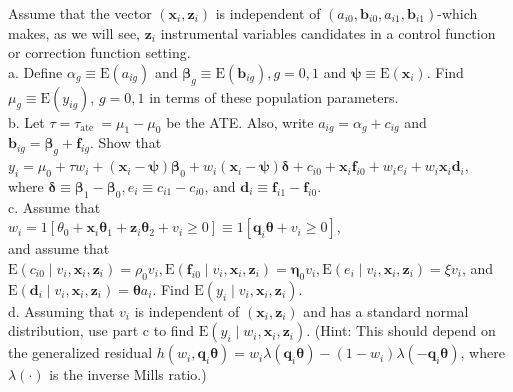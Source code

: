 \documentclass[10pt]{article}
\begin{document}
Assume that the vector $\left(\mathbf{x}_{i}, \mathbf{z}_{i}\right)$ is independent of $\left(a_{i 0}, \mathbf{b}_{i 0}, a_{i 1}, \mathbf{b}_{i 1}\right)$-which makes, as we will see, $\mathbf{z}_{i}$ instrumental variables candidates in a control function or correction function setting.\\
a. Define $\alpha_{g} \equiv \mathrm{E}\left(a_{i g}\right)$ and $\boldsymbol{\beta}_{g} \equiv \mathrm{E}\left(\mathbf{b}_{i g}\right), g=0,1$ and $\boldsymbol{\psi} \equiv \mathrm{E}\left(\mathbf{x}_{i}\right)$. Find $\mu_{g} \equiv \mathrm{E}\left(y_{i g}\right)$, $g=0,1$ in terms of these population parameters.\\
b. Let $\tau=\tau_{\text {ate }}=\mu_{1}-\mu_{0}$ be the ATE. Also, write $a_{i g}=\alpha_{g}+c_{i g}$ and $\mathbf{b}_{i g}=\boldsymbol{\beta}_{g}+\mathbf{f}_{i g}$. Show that\\
$y_{i}=\mu_{0}+\tau w_{i}+\left(\mathbf{x}_{i}-\boldsymbol{\psi}\right) \boldsymbol{\beta}_{0}+w_{i}\left(\mathbf{x}_{i}-\boldsymbol{\psi}\right) \boldsymbol{\delta}+c_{i 0}+\mathbf{x}_{i} \mathbf{f}_{i 0}+w_{i} e_{i}+w_{i} \mathbf{x}_{i} \mathbf{d}_{i}$,\\
where $\boldsymbol{\delta} \equiv \boldsymbol{\beta}_{1}-\boldsymbol{\beta}_{0}, e_{i} \equiv c_{i 1}-c_{i 0}$, and $\mathbf{d}_{i} \equiv \mathbf{f}_{i 1}-\mathbf{f}_{i 0}$.\\
c. Assume that\\
$w_{i}=1\left[\theta_{0}+\mathbf{x}_{i} \boldsymbol{\theta}_{1}+\mathbf{z}_{i} \boldsymbol{\theta}_{2}+v_{i} \geq 0\right] \equiv 1\left[\mathbf{q}_{i} \boldsymbol{\theta}+v_{i} \geq 0\right]$,\\
and assume that $\mathrm{E}\left(c_{i 0} \mid v_{i}, \mathbf{x}_{i}, \mathbf{z}_{i}\right)=\rho_{0} v_{i}, \mathrm{E}\left(\mathbf{f}_{i 0} \mid v_{i}, \mathbf{x}_{i}, \mathbf{z}_{i}\right)=\boldsymbol{\eta}_{0} v_{i}, \mathrm{E}\left(e_{i} \mid v_{i}, \mathbf{x}_{i}, \mathbf{z}_{i}\right)=\xi v_{i}$, and $\mathrm{E}\left(\mathbf{d}_{i} \mid v_{i}, \mathbf{x}_{i}, \mathbf{z}_{i}\right)=\boldsymbol{\theta} a_{i}$. Find $\mathrm{E}\left(y_{i} \mid v_{i}, \mathbf{x}_{i}, \mathbf{z}_{i}\right)$.\\
d. Assuming that $v_{i}$ is independent of $\left(\mathbf{x}_{i}, \mathbf{z}_{i}\right)$ and has a standard normal distribution, use part c to find $\mathrm{E}\left(y_{i} \mid w_{i}, \mathbf{x}_{i}, \mathbf{z}_{i}\right)$. (Hint: This should depend on the generalized residual $h\left(w_{i}, \mathbf{q}_{i} \boldsymbol{\theta}\right)=w_{i} \lambda\left(\mathbf{q}_{i} \boldsymbol{\theta}\right)-\left(1-w_{i}\right) \lambda\left(-\mathbf{q}_{i} \boldsymbol{\theta}\right)$, where $\lambda(\cdot)$ is the inverse Mills ratio.)\\
\end{document}
